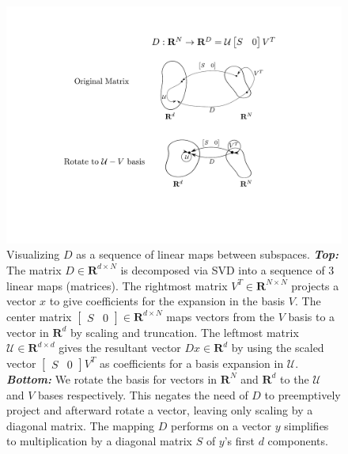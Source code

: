 \begin{enumerate}
\begin{figure}
\centering
\includegraphics[scale=.6]{figures/linear_map_sequence}
\caption{Visualizing $D$ as a sequence of linear maps between subspaces. \textbf{\textit{Top: }} The matrix $D \in \mathbf{R}^{d \times N}$ is decomposed via SVD into a sequence of 3 linear maps (matrices). The rightmost matrix $V^T \in \mathbf{R}^{N \times N}$ projects a vector  $x$  to give coefficients for the expansion in the basis $V$. The center matrix $\begin{bmatrix} S & 0 \end{bmatrix} \in \mathbf{R}^{d \times N}$ maps vectors from the $V$ basis to a vector in $\mathbf{R}^d$ by scaling and truncation. The leftmost matrix $\mathcal{U} \in \mathbf{R}^{d \times d}$ gives the resultant vector $D x \in \mathbf{R}^d$ by using the scaled vector $\begin{bmatrix} S & 0 \end{bmatrix} V^T$  as coefficients for a basis expansion in $\mathcal{U}$. \textbf{\textit{Bottom:}} We rotate the basis for vectors in $\mathbf{R}^N$ and $\mathbf{R}^d$ to the $\mathcal{U}$ and $V$ bases respectively. This negates the need of $D$ to preemptively project and afterward rotate a vector, leaving only scaling by a diagonal matrix. The mapping $D$ performs on a vector $y$ simplifies to multiplication by a diagonal matrix $S$ of $y$'s first $d$ components. 
}
\label{fig:linear_maps_between_subspaces_D_real}
\end{figure}


\end{enumerate}
